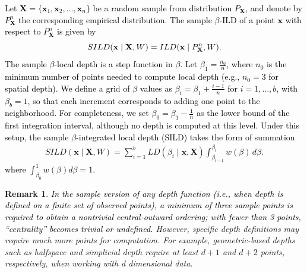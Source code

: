 \documentclass[final,3p,times]{elsarticle}
\newtheorem{remark}{\bf Remark}[section]
\newcommand{\vecx}{\mathbf{x}}
\newcommand{\vecX}{\mathbf{X}}
\begin{document}
\textcolor{black}{
Let $\vecX = \{\vecx_1,\vecx_2,\ldots,\vecx_n\}$ be a random sample from distribution $P_\vecX$, and denote by $P_\vecX^n$ the corresponding empirical distribution. The sample $\beta$-ILD of a point $\vecx$ with respect to $P_\vecX^n$ is given by
\begin{equation}\notag
SILD(\vecx\mid \vecX, W)=ILD(\vecx \mid P_\vecX^n, W).
\end{equation}
The sample $\beta$-local depth is a step function in $\beta$. Let $\beta_1 = \frac{n_0}{n}$, where $n_0$ is the minimum number of points needed to compute local depth (e.g., $n_0 = 3$ for spatial depth). We define a grid of $\beta$ values as $\beta_i = \beta_1 + \frac{i - 1}{n}$ for $i = 1, \ldots, b$, with $\beta_b = 1$, so that each increment corresponds to adding one point to the neighborhood. For completeness, we set $\beta_0 = \beta_1 - \frac{1}{n}$ as the lower bound of the first integration interval, although no depth is computed at this level. Under this setup, the sample $\beta$-integrated local depth (SILD) takes the form of summation
\begin{eqnarray}
    SILD(\vecx\mid\vecX, W)=\sum_{i=1}^{b}LD(\beta_{i} \mid \vecx, \vecX) \int_{\beta_{i-1}}^{\beta_{i}} w(\beta) \, d\beta.
\end{eqnarray}
where $\int_{\beta_0}^1 w(\beta)d\beta=1$.}
\begin{remark}
    \textcolor{black}{In the sample version of any depth function (i.e., when depth is defined on a finite set of observed points), a minimum of three sample points is required to obtain a nontrivial central‐outward ordering; with fewer than 3 points, ``centrality'' becomes trivial or undefined.} However, specific depth definitions may require much more points for computation. For example, geometric-based depths such as halfspace and simplicial depth require at least $ d+1 $ and $ d+2 $ points, respectively, when working with d dimensional data. 
\end{remark}
\end{document}
